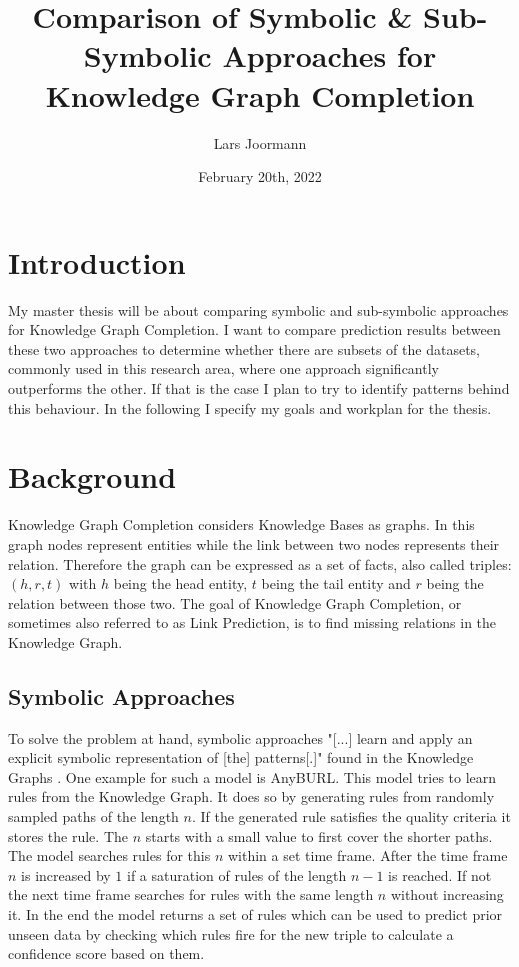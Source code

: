 \documentclass[a4paper]{scrartcl}
\title{Comparison of Symbolic \& Sub-Symbolic Approaches for Knowledge Graph Completion}
\author{Lars Joormann}
\date{February 20th, 2022}
\begin{document}
\maketitle

\section{Introduction}

My master thesis will be about comparing symbolic and sub-symbolic approaches for Knowledge Graph Completion. I want to compare prediction results between these two approaches to determine whether there are subsets of the datasets, commonly used in this research area, where one approach significantly outperforms the other. If that is the case I plan to try to identify patterns behind this behaviour. In the following I specify my goals and workplan for the thesis.

\section{Background}Knowledge Graph Completion considers Knowledge Bases as graphs. In this graph nodes represent entities while the link between two nodes represents their relation. Therefore the graph can be expressed as a set of facts, also called triples: $(h,r,t)$ with $h$ being the head entity, $t$ being the tail entity and $r$ being the relation between those two. The goal of Knowledge Graph Completion, or sometimes also referred to as Link Prediction, is to find missing relations in the Knowledge Graph.  \cite{bordes_learning_2011}
 
\subsection{Symbolic Approaches}
To solve the problem at hand, symbolic approaches "[...] learn and apply an explicit symbolic representation of [the] patterns[.]" found in the Knowledge Graphs \cite{meilicke_reinforced_2020}. 
One example for such a model is AnyBURL. This model tries to learn rules from the Knowledge Graph. It does so by generating rules from randomly sampled paths of the length $n$. If the generated rule satisfies the quality criteria it stores the rule. The $n$ starts with a small value to first cover the shorter paths. The model searches rules for this $n$ within a set time frame. After the time frame $n$ is increased by $1$ if a saturation of rules of the length $n-1$ is reached. If not the next time frame searches for rules with the same length $n$ without increasing it. In the end the model returns a set of rules which can be used to predict prior unseen data by checking which rules fire for the new triple to calculate a confidence score based on them. \cite{meilicke_anytime_2019}
\end{document}
